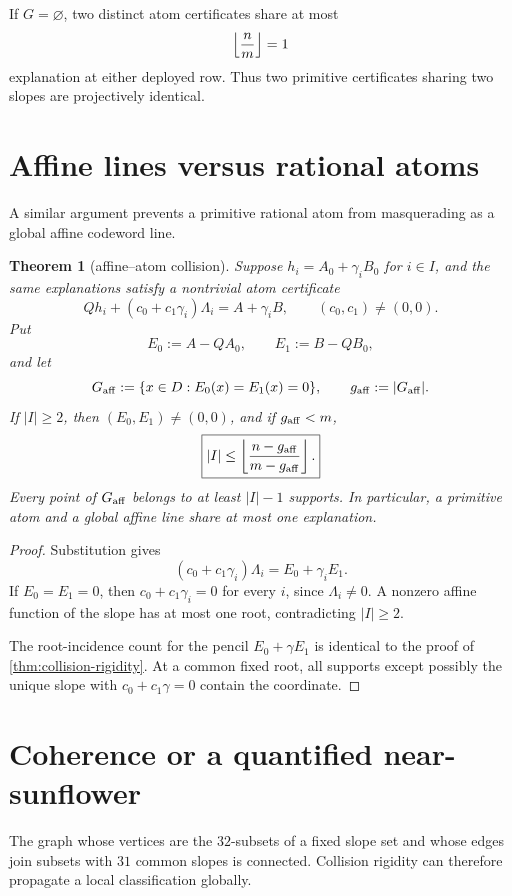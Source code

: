 \documentclass[11pt,a4paper]{amsart}
\numberwithin{equation}{section}
\newtheorem{theorem}{Theorem}[section]
\theoremstyle{remark}
\begin{document}
\begin{corollary}\label{cor:primitive-unique}
If $G=\varnothing$, two distinct atom certificates share at most
\[
 \left\lfloor \frac nm\right\rfloor=1
\]
explanation at either deployed row.  Thus two primitive certificates sharing two slopes are projectively identical.
\end{corollary}

\section{Affine lines versus rational atoms}

A similar argument prevents a primitive rational atom from masquerading as a global affine codeword line.

\begin{theorem}[affine--atom collision]\label{thm:affine-atom}
Suppose $h_i=A_0+\gamma_iB_0$ for $i\in I$, and the same explanations satisfy a nontrivial atom certificate
\[
 Qh_i+(c_0+c_1\gamma_i)\Lambda_i=A+\gamma_iB,
 \qquad (c_0,c_1)\ne(0,0).
\]
Put
\[
 E_0:=A-QA_0,
 \qquad
 E_1:=B-QB_0,
\]
and let
\[
 G_{\rm aff}:=\{x\in D:E_0(x)=E_1(x)=0\},
 \qquad g_{\rm aff}:=|G_{\rm aff}|.
\]
If $|I|\ge2$, then $(E_0,E_1)\ne(0,0)$, and if $g_{\rm aff}<m$,
\[
 \boxed{
 |I|\le\left\lfloor \frac{n-g_{\rm aff}}{m-g_{\rm aff}}\right\rfloor.
 }
\]
Every point of $G_{\rm aff}$ belongs to at least $|I|-1$ supports.
In particular, a primitive atom and a global affine line share at most one explanation.
\end{theorem}

\begin{proof}
Substitution gives
\[
 (c_0+c_1\gamma_i)\Lambda_i=E_0+\gamma_iE_1.
\]
If $E_0=E_1=0$, then $c_0+c_1\gamma_i=0$ for every $i$, since $\Lambda_i\ne0$.  A nonzero affine function of the slope has at most one root, contradicting $|I|\ge2$.

The root-incidence count for the pencil $E_0+\gamma E_1$ is identical to the proof of \cref{thm:collision-rigidity}.  At a common fixed root, all supports except possibly the unique slope with $c_0+c_1\gamma=0$ contain the coordinate.
\end{proof}

\section{Coherence or a quantified near-sunflower}

The graph whose vertices are the $32$-subsets of a fixed slope set and whose edges join subsets with $31$ common slopes is connected.  Collision rigidity can therefore propagate a local classification globally.
\end{document}
